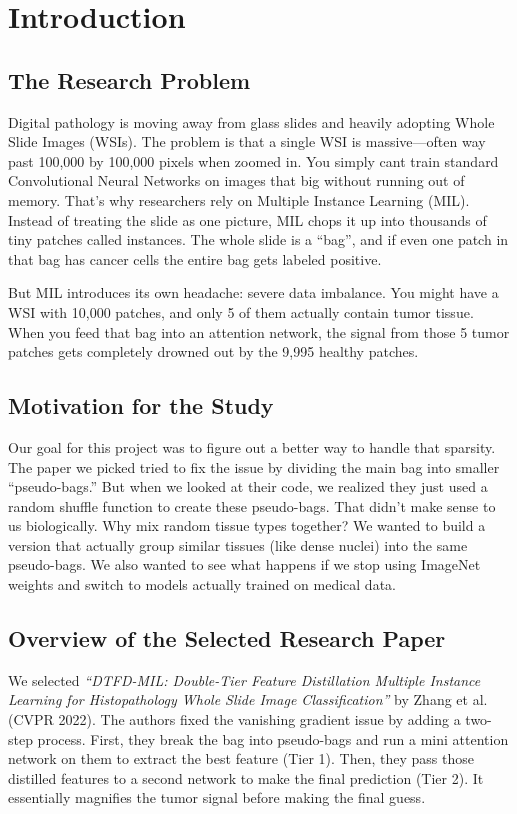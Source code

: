 \documentclass[12pt, a4paper]{article}
\begin{document}
\newpage
\tableofcontents
\newpage

\section{Introduction}
\subsection{The Research Problem}
Digital pathology is moving away from glass slides and heavily adopting Whole Slide Images (WSIs). The problem is that a single WSI is massive—often way past 100,000 by 100,000 pixels when zoomed in. You simply cant train standard Convolutional Neural Networks on images that big without running out of memory. That's why researchers rely on Multiple Instance Learning (MIL). Instead of treating the slide as one picture, MIL chops it up into thousands of tiny patches called instances. The whole slide is a ``bag'', and if even one patch in that bag has cancer cells the entire bag gets labeled positive.

But MIL introduces its own headache: severe data imbalance. You might have a WSI with 10,000 patches, and only 5 of them actually contain tumor tissue. When you feed that bag into an attention network, the signal from those 5 tumor patches gets completely drowned out by the 9,995 healthy patches.

\subsection{Motivation for the Study}
Our goal for this project was to figure out a better way to handle that sparsity. The paper we picked tried to fix the issue by dividing the main bag into smaller ``pseudo-bags.'' But when we looked at their code, we realized they just used a random shuffle function to create these pseudo-bags. That didn't make sense to us biologically. Why mix random tissue types together? We wanted to build a version that actually group similar tissues (like dense nuclei) into the same pseudo-bags. We also wanted to see what happens if we stop using ImageNet weights and switch to models actually trained on medical data.

\subsection{Overview of the Selected Research Paper}
We selected \textit{``DTFD-MIL: Double-Tier Feature Distillation Multiple Instance Learning for Histopathology Whole Slide Image Classification''} by Zhang et al. (CVPR 2022). The authors fixed the vanishing gradient issue by adding a two-step process. First, they break the bag into pseudo-bags and run a mini attention network on them to extract the best feature (Tier 1). Then, they pass those distilled features to a second network to make the final prediction (Tier 2). It essentially magnifies the tumor signal before making the final guess.
\end{document}
